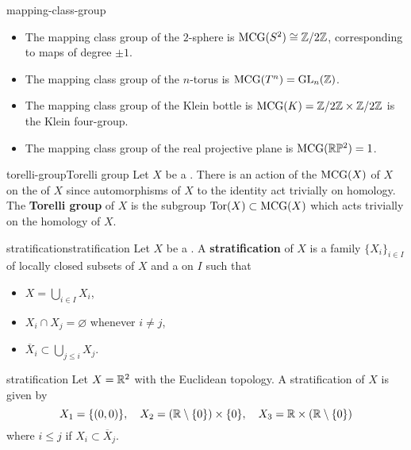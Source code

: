 \begin{example}{mapping-class-group}
    \begin{itemize}
        \item The mapping class group of the $2$-sphere is $\textup{MCG}(S^2) \cong \mathbb{Z}/2\mathbb{Z}$, corresponding to maps of degree $\pm 1$.
        \item The mapping class group of the $n$-torus is $\textup{MCG}(T^n) = \textup{GL}_n(\mathbb{Z})$.
        \item The mapping class group of the Klein bottle is $\textup{MCG}(K) = \mathbb{Z}/2\mathbb{Z} \times \mathbb{Z}/2\mathbb{Z}$ is the Klein four-group.
        \item The mapping class group of the real projective plane is $\textup{MCG}(\mathbb{R} \mathbb{P}^2) = 1$.
    \end{itemize}
\end{example}

\begin{topic}{torelli-group}{Torelli group}
    Let $X$ be a . There is an action of the  $\textup{MCG}(X)$ of $X$ on the  of $X$ since automorphisms of $X$  to the identity act trivially on homology. The \textbf{Torelli group} of $X$ is the subgroup $\textup{Tor}(X) \subset \textup{MCG}(X)$ which acts trivially on the homology of $X$.
\end{topic}

\begin{topic}{stratification}{stratification}
    Let $X$ be a . A \textbf{stratification} of $X$ is a family $\{ X_i \}_{i \in I}$ of locally closed subsets of $X$ and a  on $I$ such that
    \begin{itemize}
        \item $X = \bigcup_{i \in I} X_i$,
        \item $X_i \cap X_j = \varnothing$ whenever $i \ne j$,
        \item $\overline{X}_i \subset \bigcup_{j \le i} X_j$.
    \end{itemize}
\end{topic}

\begin{example}{stratification}
    Let $X = \mathbb{R}^2$ with the Euclidean topology. A stratification of $X$ is given by
    \[ X_1 = \{ (0, 0) \}, \quad X_2 = (\mathbb{R} \setminus \{ 0 \}) \times \{ 0 \}, \quad X_3 = \mathbb{R} \times (\mathbb{R} \setminus \{ 0 \}) \]
    where $i \le j$ if $X_i \subset \overline{X}_j$.
\end{example}

